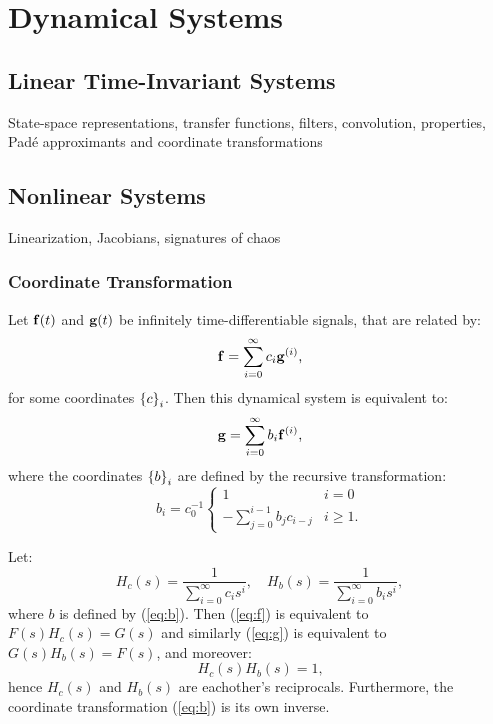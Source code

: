 \section{Dynamical Systems}

\subsection{Linear Time-Invariant Systems}

State-space representations, transfer functions, filters, convolution, properties, Pad\'e approximants and coordinate transformations

\subsection{Nonlinear Systems}

Linearization, Jacobians, signatures of chaos

\subsubsection{Coordinate Transformation}

\begin{theorem}
Let $\mathbf{f}(t)$ and $\mathbf{g}(t)$ be infinitely time-differentiable signals, that are related by:
\begin{equation} \label{eq:f}
\mathbf{f} = \sum_{i=0}^\infty c_i \mathbf{g}^{(i)} \text{,}
\end{equation}
for some coordinates $\left\{ c \right\}_{i}$. Then this dynamical system is equivalent to:
\begin{equation} \label{eq:g}
\mathbf{g} = \sum_{i=0}^\infty b_i \mathbf{f}^{(i)} \text{,}
\end{equation}
where the coordinates $\left\{ b \right\}_{i}$ are defined by the recursive transformation:
\begin{equation} \label{eq:b}
b_i = c_0^{-1} \begin{cases}
    1 & i = 0 \\
    - \sum_{j=0}^{i-1} b_j c_{i - j} & i \ge 1 \text{.}
  \end{cases}
\end{equation}
\end{theorem}

\begin{corollary}
Let: $$H_c(s) = \frac{1}{\sum_{i=0}^\infty c_i s^i}, \quad H_b(s) = \frac{1}{\sum_{i=0}^\infty b_i s^i}, $$ where $b$ is defined by (\ref{eq:b}). Then (\ref{eq:f}) is equivalent to $F(s)H_c(s) = G(s)$ and similarly (\ref{eq:g}) is equivalent to $G(s)H_b(s) = F(s)$, and moreover:
\begin{equation} \label{eq:inv}
H_c(s) H_b(s) = 1 \text{,}
\end{equation}
hence $H_c(s)$ and $H_b(s)$ are eachother's reciprocals. Furthermore, the coordinate transformation (\ref{eq:b}) is its own inverse.
\end{corollary}

